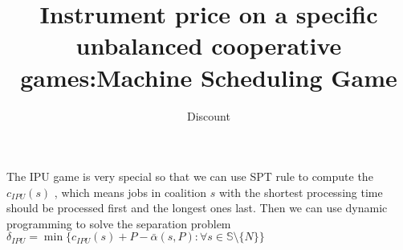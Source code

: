 \documentclass[UTF8]{article}
\title{Instrument price on a specific unbalanced cooperative games:Machine Scheduling Game}
\author{Dis\cdot count}
\begin{document}
\maketitle{}









%














The IPU game is very special so that we can use SPT rule to compute the $c_{IPU}(s)$ , which means jobs in coalition $s$ with the shortest processing time should be processed first and the longest ones last. Then we can use dynamic programming to solve the separation problem $\delta_{IPU} = \min \big\{c_{IPU}(s)+P-\bar{\alpha}(s,P): \forall s \in \mathbb{S} \setminus \{N\}\big\} $
\end{document}
